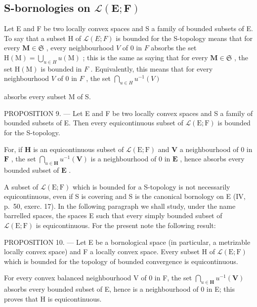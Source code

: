 \subsection{\texorpdfstring{S-bornologies on \(\mathcal{L}(\mathbf{E};\mathbf{F})\)}{S-bornologies on \textbackslash mathcal\{L\}(\textbackslash mathbf\{E\};\textbackslash mathbf\{F\})}}

Let E and F be two locally convex spaces and S a family of bounded subsets of E. To say that a subset H of \(\mathcal{L}(E; F)\) is bounded for the S-topology means that for every \(\mathbf{M} \in \mathfrak{S}\) , every neighbourhood \(V\) of 0 in \(F\) absorbs the set \(\mathrm{H(M)} = \bigcup_{u \in H} u(\mathrm{M})\) ; this is the same as saying that for every \(\mathbf{M} \in \mathfrak{S}\) , the set \(\mathrm{H(M)}\) is bounded in \(F\) . Equivalently, this means that for every neighbourhood \(V\) of 0 in \(F\) , the set \(\bigcap_{u \in H} u^{-1}(V)\)

absorbs every subset M of S.

PROPOSITION 9. --- Let E and F be two locally convex spaces and S a family of bounded subsets of E. Then every equicontinuous subset of \(\mathcal{L}(\mathrm{E};\mathrm{F})\) is bounded for the S-topology.

For, if \(\mathbf{H}\) is an equicontinuous subset of \(\mathcal{L}(\mathrm{E};\mathrm{F})\) and \(\mathbf{V}\) a neighbourhood of 0 in \(\mathbf{F}\) , the set \(\bigcap_{u\in \mathbf{H}}u^{-1}(\mathbf{V})\) is a neighbourhood of 0 in \(\mathbf{E}\) , hence absorbs every bounded subset of \(\mathbf{E}\) .

A subset of \(\mathcal{L}(\mathrm{E};\mathrm{F})\) which is bounded for a S-topology is not necessarily equicontinuous, even if S is covering and S is the canonical bornology on E (IV, p.~50, exerc. 17). In the following paragraph we shall study, under the name barrelled spaces, the spaces E such that every simply bounded subset of \(\mathcal{L}(\mathrm{E};\mathrm{F})\) is equicontinuous. For the present note the following result:

PROPOSITION 10. --- Let E be a bornological space (in particular, a metrizable locally convex space) and F a locally convex space. Every subset H of \(\mathcal{L}(\mathrm{E};\mathrm{F})\) which is bounded for the topology of bounded convergence is equicontinuous.

For every convex balanced neighbourhood V of 0 in F, the set \(\bigcap_{u\in\mathbf{H}}u^{-1}(\mathbf{V})\) absorbs every bounded subset of E, hence is a neighbourhood of 0 in E; this proves that H is equicontinuous.

